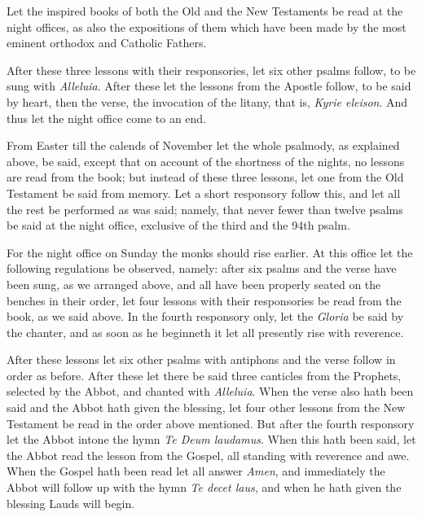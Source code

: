Let the inspired books of both the Old and the New Testaments be read at the night offices, as also the expositions of them which have been made by the most eminent orthodox and Catholic Fathers.

After these three lessons with their responsories, let six other psalms follow, to be sung with \emph{Alleluia}. After these let the lessons from the Apostle follow, to be said by heart, then the verse, the invocation of the litany, that is, \emph{Kyrie eleison}. And thus let the night office come to an end.


From Easter till the calends of November let the whole psalmody, as explained above, be said, except that on account of the shortness of the nights, no lessons are read from the book; but instead of these three lessons, let one from the Old Testament be said from memory. Let a short responsory follow this, and let all the rest be performed as was said; namely, that never fewer than twelve psalms be said at the night office, exclusive of the third and the 94th psalm.


For the night office on Sunday the monks should rise earlier. At this office let the following regulations be observed, namely: after six psalms and the verse have been sung, as we arranged above, and all have been properly seated on the benches in their order, let four lessons with their responsories be read from the book, as we said above. In the fourth responsory only, let the \emph{Gloria} be said by the chanter, and as soon as he beginneth it let all presently rise with reverence.

After these lessons let six other psalms with antiphons and the verse follow in order as before. After these let there be said three canticles from the Prophets, selected by the Abbot, and chanted with \emph{Alleluia}. When the verse also hath been said and the Abbot hath given the blessing, let four other lessons from the New Testament be read in the order above mentioned. But after the fourth responsory let the Abbot intone the hymn \emph{Te Deum laudamus}. When this hath been said, let the Abbot read the lesson from the Gospel, all standing with reverence and awe. When the Gospel hath been read let all answer \emph{Amen}, and immediately the Abbot will follow up with the hymn \emph{Te decet laus}, and when he hath given the blessing Lauds will begin.

